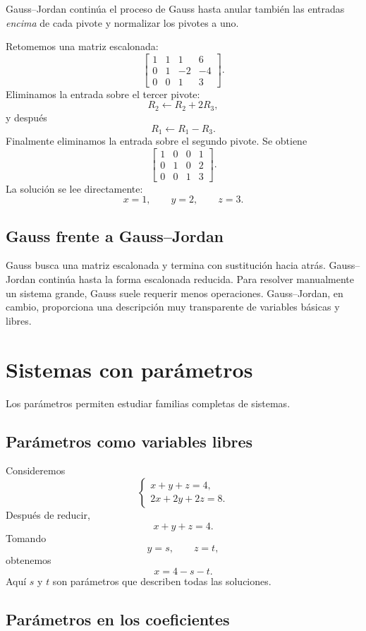 \documentclass[12pt]{article}
\theoremstyle{remark}
\begin{document}
Gauss--Jordan continúa el proceso de Gauss hasta anular también las entradas \emph{encima} de cada
pivote y normalizar los pivotes a uno.

Retomemos una matriz escalonada:
\[
\left[
\begin{array}{ccc|c}
1&1&1&6\\
0&1&-2&-4\\
0&0&1&3
\end{array}
\right].
\]
Eliminamos la entrada sobre el tercer pivote:
\[
R_2\leftarrow R_2+2R_3,
\]
y después
\[
R_1\leftarrow R_1-R_3.
\]
Finalmente eliminamos la entrada sobre el segundo pivote. Se obtiene
\[
\left[
\begin{array}{ccc|c}
1&0&0&1\\
0&1&0&2\\
0&0&1&3
\end{array}
\right].
\]
La solución se lee directamente:
\[
x=1,\qquad y=2,\qquad z=3.
\]

\subsection{Gauss frente a Gauss--Jordan}

Gauss busca una matriz escalonada y termina con sustitución hacia atrás. Gauss--Jordan continúa hasta
la forma escalonada reducida. Para resolver manualmente un sistema grande, Gauss suele requerir menos
operaciones. Gauss--Jordan, en cambio, proporciona una descripción muy transparente de variables
básicas y libres.

\section{Sistemas con parámetros}

Los parámetros permiten estudiar familias completas de sistemas.

\subsection{Parámetros como variables libres}

Consideremos
\[
\begin{cases}
x+y+z=4,\\
2x+2y+2z=8.
\end{cases}
\]
Después de reducir,
\[
x+y+z=4.
\]
Tomando
\[
y=s,\qquad z=t,
\]
obtenemos
\[
x=4-s-t.
\]
Aquí $s$ y $t$ son parámetros que describen todas las soluciones.

\subsection{Parámetros en los coeficientes}
\end{document}
